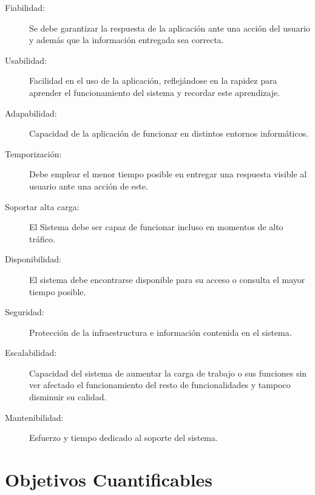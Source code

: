 \begin{description}

\item[Fiabilidad:]\hfill

Se debe garantizar la respuesta de la aplicación ante una acción del usuario y además que la información entregada sea correcta.

\item[Usabilidad:]\hfill

Facilidad en el uso de la aplicación, reflejándose en la rapidez para aprender el funcionamiento del sistema y recordar este aprendizaje.

\item[Adapabilidad:]\hfill

Capacidad de la aplicación de funcionar en distintos entornos informáticos.

\item[Temporización:]\hfill 

Debe emplear el menor tiempo posible en entregar una respuesta visible al usuario ante una acción de este.

\item[Soportar alta carga:]\hfill 

El Sistema debe ser capaz de funcionar incluso en momentos de alto tráfico. 

\item[Disponibilidad:]\hfill 

El sistema debe encontrarse disponible para su acceso o consulta el mayor tiempo posible.

\item[Seguridad:]\hfill 

Protección de la infraestructura e información contenida en el sistema.

\item[Escalabilidad:]\hfill 

Capacidad del sistema de aumentar la carga de trabajo o sus funciones sin ver afectado el funcionamiento del resto de funcionalidades y tampoco disminuir su calidad.

\item[Mantenibilidad:]\hfill

 Esfuerzo y tiempo dedicado al soporte del sistema.

\end{description}

\section{Objetivos Cuantificables}

